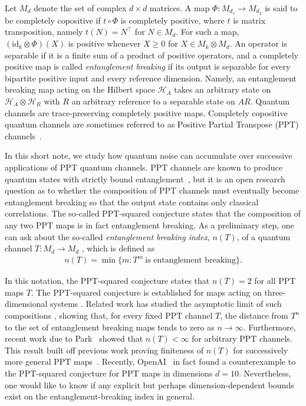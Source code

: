 \documentclass[aps,prl,reprint,superscriptaddress,longbibliography,raggedbottom]{revtex4-2}
\newcommand{\id}{\mathrm{id}}
\begin{document}
Let $M_d$ denote the set of complex $d\times d$ matrices. A map
$\Phi:M_{d_1} \to M_{d_2}$ is said to be completely copositive if $t\circ\Phi$ is completely
positive, where $t$ is matrix transposition, namely $t(N) = N^{\top}$ for $N \in M_d$. For such a map, 
$(\id_k\otimes\Phi)(X)$ is positive whenever $X\ge0$ for $X \in M_k \otimes M_d$.
An operator is separable if it is a finite sum of a product of positive operators, and a
completely positive map is called \emph{entanglement breaking} if its output is
separable for every bipartite positive input and every reference
dimension. Namely, an entanglement breaking map acting on the Hilbert space $\mathcal{H}_A$ takes an arbitrary state on $\mathcal{H}_A \otimes \mathcal{H}_R$ with $R$ an arbitrary reference to a separable state on $AR$. Quantum channels are trace-preserving completely positive maps. Completely copositive quantum channels are sometimes referred to as Positive Partial Transpose (PPT) channels~\cite{HSR03}.

In this short note, we study how quantum noise can accumulate over successive applications of PPT quantum channels. PPT channels are known to produce quantum states with strictly bound entanglement~\cite{HHH98}, but it is an open research question as to whether the composition of PPT channels must eventually become entanglement breaking so that the output state contains only classical correlations. The so-called PPT-squared conjecture states that the composition of any two PPT maps is in fact entanglement breaking. As a preliminary step, one can ask about the so-called \emph{entanglement breaking index}, $n(T)$, of a quantum channel $T:M_d \to M_d$  \cite{CMHW19}, which is defined as
\begin{align}
n(T) = \min \lbrace m : T^m\ \text{is entanglement breaking} \rbrace.
\end{align}

In this notation, the PPT-squared conjecture states that $n(T) = 2$ for all PPT maps $T$. The PPT-squared conjecture is established for maps acting on three-dimensional systems
\cite{CMHW19,CYT19}. Related work has studied the asymptotic limit of such compositions
\cite{KMP17}, showing that, for every fixed PPT channel $T$, the distance from $T^n$ to the set of entanglement breaking maps tends to zero as $n\to\infty$. Furthermore, recent work due to Park~\cite{Park26} showed that $n(T) < \infty$ for arbitrary PPT channels. This result built off previous work proving finiteness of $n(T)$ for successively more general PPT maps~\cite{RJP18,HRSF20}. Recently, OpenAI~\cite{OpenAI26} in fact found a counterexample to the PPT-squared conjecture for PPT maps in dimensions $d = 10$. Nevertheless, one would like to know if any explicit but perhaps dimension-dependent bounds exist on the entanglement-breaking index in general.
\end{document}
